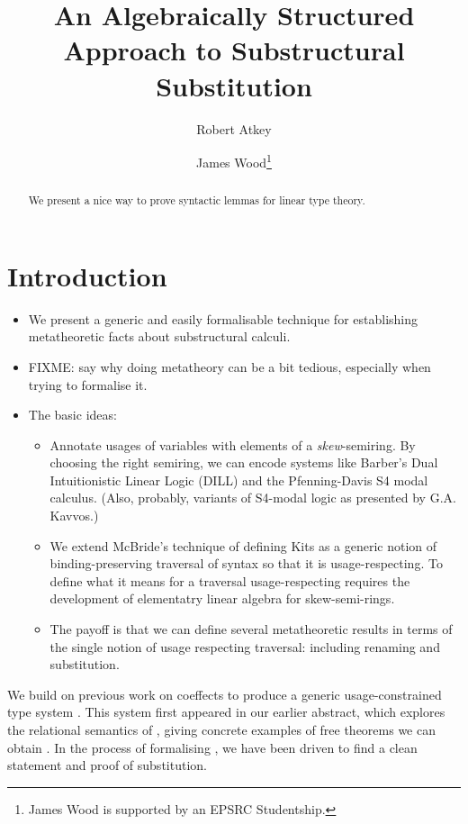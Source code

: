 \documentclass[submission,copyright,creativecommons]{eptcs}
\title{An Algebraically Structured Approach to Substructural Substitution}
\author{Robert Atkey
\institute{University of Strathclyde\\ Glasgow, United Kingdom}
\email{robert.atkey@strath.ac.uk}
\and
James Wood\thanks{James Wood is supported by an EPSRC Studentship.}
\institute{University of Strathclyde\\ Glasgow, United Kingdom}
\email{james.wood.100@strath.ac.uk}
}
\begin{document}
\maketitle

\begin{abstract}
  We present a nice way to prove syntactic lemmas for linear type theory.
\end{abstract}

\section{Introduction}

\begin{itemize}
\item We present a generic and easily formalisable technique for
  establishing metatheoretic facts about substructural calculi.
\item FIXME: say why doing metatheory can be a bit tedious, especially
  when trying to formalise it.
\item The basic ideas:
  \begin{itemize}
  \item Annotate usages of variables with elements of a
    \emph{skew}-semiring. By choosing the right semiring, we can
    encode systems like Barber's Dual Intuitionistic Linear Logic
    (DILL) and the Pfenning-Davis S4 modal calculus. (Also, probably,
    variants of S4-modal logic as presented by G.A. Kavvos.)
  \item We extend McBride's technique of defining Kits as a generic
    notion of binding-preserving traversal of syntax so that it is
    usage-respecting. To define what it means for a traversal
    usage-respecting requires the development of elementatry linear
    algebra for skew-semi-rings.
  \item The payoff is that we can define several metatheoretic results
    in terms of the single notion of usage respecting traversal:
    including renaming and substitution.
  \end{itemize}
\end{itemize}

We build on previous work on coeffects
\cite{BrunelGMZ14,GhicaS14,reed10distance,PetricekOM14} to produce a generic
usage-constrained type system \name{}.
This system first appeared in our earlier abstract, which explores the
relational semantics of \name{}, giving concrete examples of free theorems we
can obtain \cite{context-constrained}.
In the process of formalising \name{}, we have been driven to find a clean
statement and proof of substitution.
\end{document}
